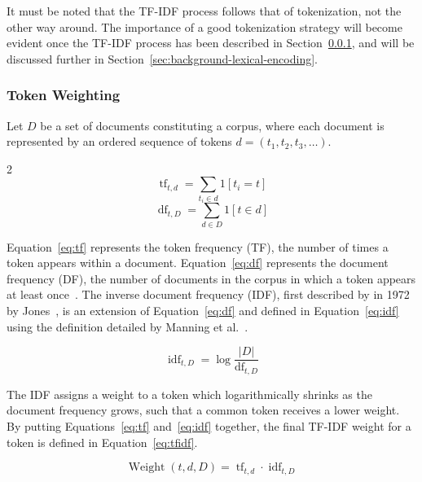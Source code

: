 \documentclass[11pt]{article}
\theoremstyle{plain}
\theoremstyle{definition}
\begin{document}
It must be noted that the TF-IDF process follows that of tokenization, not the other way around. The importance of a good tokenization strategy will become evident once the TF-IDF process has been described in Section~\ref{sec:background-lexical-weighting}, and will be discussed further in Section~\ref{sec:background-lexical-encoding}.

\subsubsection{Token Weighting}\label{sec:background-lexical-weighting}

Let $D$  be a set of documents constituting a corpus, where each document is represented by an ordered sequence of tokens $d = (t_1, t_2, t_3, \dots)$.

\begin{multicols}{2}
    \begin{equation}\label{eq:tf}
        \operatorname{tf}_{t,d} = \sum_{t_i\in d} 1[t_i = t]
    \end{equation}
    \break{}
    \begin{equation}\label{eq:df}
        \operatorname{df}_{t, D} = \sum_{d\in D} 1[t \in d]
    \end{equation}
\end{multicols}

Equation~\ref{eq:tf} represents the token frequency (TF), the number of times a token appears within a document. Equation~\ref{eq:df} represents the document frequency (DF), the number of documents in the corpus in which a token appears at least once~\cite{manning/2008/scoring}. The inverse document frequency (IDF), first described by in 1972 by Jones~\cite{jones/1972/statistical}, is an extension of Equation~\ref{eq:df} and defined in Equation~\ref{eq:idf} using the definition detailed by Manning et al.\ \cite{manning/2008/scoring}.

\begin{equation}\label{eq:idf}
    \operatorname{idf}_{t, D} = \log{\frac{|D|}{\operatorname{df}_{t, D}}}
\end{equation}

The IDF assigns a weight to a token which logarithmically shrinks as the document frequency grows, such that a common token receives a lower weight. By putting Equations~\ref{eq:tf} and~\ref{eq:idf} together, the final TF-IDF weight for a token is defined in Equation~\ref{eq:tfidf}.

\begin{equation}\label{eq:tfidf}
    \operatorname{Weight}(t, d, D) = \operatorname{tf}_{t,d} \cdot \operatorname{idf}_{t, D}
\end{equation}
\end{document}

